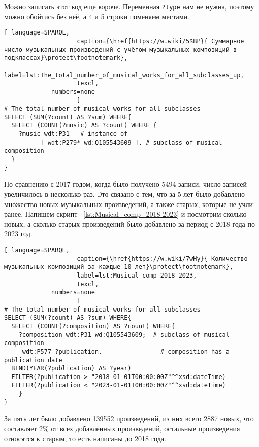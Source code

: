 Можно записать этот код еще короче. Переменная \lstinline|?type| нам не нужна, поэтому можно обойтись без неё, а 4 и 5 строки поменяем местами.

\begin{lstlisting}[ language=SPARQL,
                    caption={\href{https://w.wiki/5$BP}{ Суммарное число музыкальных произведений с учётом музыкальных композиций в подклассах}\protect\footnotemark},
                    label=lst:The_total_number_of_musical_works_for_all_subclasses_up,
                    texcl,
	         numbers=none
                    ]
# The total number of musical works for all subclasses 
SELECT (SUM(?count) AS ?sum) WHERE{
  SELECT (COUNT(?music) AS ?count) WHERE {
    ?music wdt:P31   # instance of
          [ wdt:P279* wd:Q105543609 ]. # subclass of musical composition
  }
}
\end{lstlisting}%

По сравнению с 2017 годом, когда было получено \num{5494} записи, число записей увеличилось в несколько раз. Это связано с тем, что за 5 лет было добавлено множество новых музыкальных произведений, а также старых, которые не учли ранее.
Напишем скрипт ~\ref{lst:Musical_comp_2018-2023} и посмотрим сколько новых, а сколько старых произведений было добавлено за период с 2018 года по 2023 год.

\begin{lstlisting}[ language=SPARQL,
                    caption={\href{https://w.wiki/7wHy}{ Количество музыкальных композиций за каждые 10 лет}\protect\footnotemark},
                    label=lst:Musical_comp_2018-2023,
                    texcl,
	         numbers=none
                    ]
# The total number of musical works for all subclasses 
SELECT (SUM(?count) AS ?sum) WHERE{
  SELECT (COUNT(?composition) AS ?count) WHERE{
    ?composition wdt:P31 wd:Q105543609;  # subclass of musical composition
     wdt:P577 ?publication.                # composition has a publication date
  BIND(YEAR(?publication) AS ?year)
  FILTER(?publication > "2018-01-01T00:00:00Z"^^xsd:dateTime)
  FILTER(?publication < "2023-01-01T00:00:00Z"^^xsd:dateTime) 
    }
}
\end{lstlisting}%

За пять лет было добавлено \num{139552} произведений, из них всего \num{2887} новых, что составляет 2\% от всех добавленных произведений, остальные произведения относятся к старым, то есть написаны до 2018 года.

